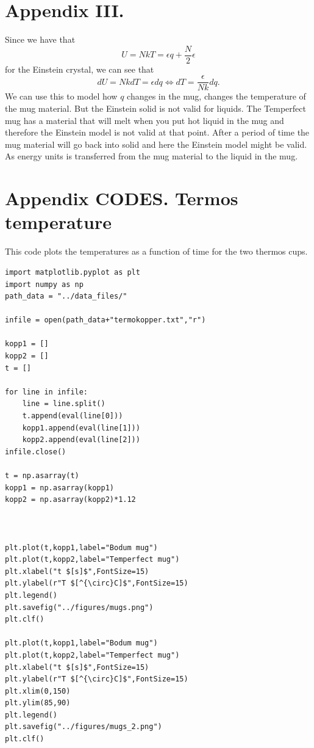 \documentclass[reprint,english,notitlepage]{revtex4-1}  %
\begin{document}
\section*{Appendix III.}
Since we have that 
$$U=NkT=\epsilon q+\frac{N}{2}\epsilon$$ 
for the Einstein crystal, we can see that
$$ dU=NkdT=\epsilon dq\Leftrightarrow dT=\frac{\epsilon}{Nk}dq.$$
We can use this to model how $q$ changes in the mug, changes the temperature of the mug material. But the Einstein solid is not valid for liquids. The Temperfect mug has a material that will melt when you put hot liquid in the mug and therefore the Einstein model is not valid at that point. After a period of time the mug material will go back into solid and here the Einstein model might be valid. As energy units is transferred from the mug material to the liquid in the mug. 

\section*{Appendix CODES. Termos temperature}
This code plots the temperatures as a function of time for the two thermos cups.
\begin{lstlisting}
import matplotlib.pyplot as plt
import numpy as np
path_data = "../data_files/"

infile = open(path_data+"termokopper.txt","r")

kopp1 = []
kopp2 = []
t = []

for line in infile:
    line = line.split()
    t.append(eval(line[0]))
    kopp1.append(eval(line[1]))
    kopp2.append(eval(line[2]))
infile.close()

t = np.asarray(t)
kopp1 = np.asarray(kopp1)
kopp2 = np.asarray(kopp2)*1.12



plt.plot(t,kopp1,label="Bodum mug")
plt.plot(t,kopp2,label="Temperfect mug")
plt.xlabel("t $[s]$",FontSize=15)
plt.ylabel(r"T $[^{\circ}C]$",FontSize=15)
plt.legend()
plt.savefig("../figures/mugs.png")
plt.clf()

plt.plot(t,kopp1,label="Bodum mug")
plt.plot(t,kopp2,label="Temperfect mug")
plt.xlabel("t $[s]$",FontSize=15)
plt.ylabel(r"T $[^{\circ}C]$",FontSize=15)
plt.xlim(0,150)
plt.ylim(85,90)
plt.legend()
plt.savefig("../figures/mugs_2.png")
plt.clf()
\end{lstlisting}
\end{document}
